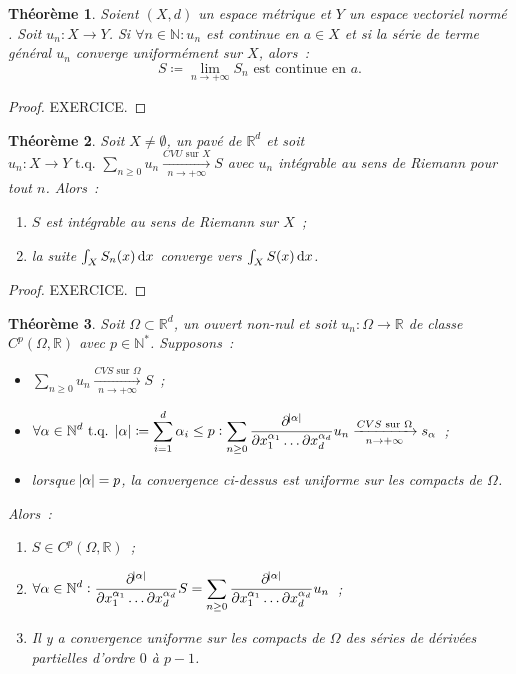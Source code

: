 \documentclass{report}
\newtheorem{thm}{Théorème}[chapter]
\theoremstyle{definition}
\theoremstyle{remark}
\numberwithin{equation}{section}
\newcommand{\R}{\mathbb R}
\newcommand{\N}{\mathbb N}
\newcommand{\tq}{\text{ t.q. }}
\newcommand{\CONV}[5]{\xrightarrow[#2 \to #3]{#4 \text{ #5 } #1}}
\newcommand{\CVS}[3]{\CONV{#1}{#2}{#3}{CVS}{sur}}
\newcommand{\CVU}[3]{\CONV{#1}{#2}{#3}{CVU}{sur}}
\newcommand{\pinfty}{{+\infty}}
\newcommand{\evn}{espace vectoriel normé }
\begin{document}
			\begin{thm}\label{thm:fncvusériecvg} Soient $(X, d)$ un espace métrique et $Y$ un \evn. Soit $u_n : X \to Y$. Si $\forall n \in \N : u_n$ est continue en
			$a \in X$ et si la série de terme général $u_n$ converge uniformément sur $X$, alors~:
			\begin{equation}
				S \coloneqq \lim_{n \to \pinfty}S_n \text{ est continue en } a.
			\end{equation}
			\end{thm}

			\begin{proof} EXERCICE.
			\end{proof}

			\begin{thm} Soit $X \neq \emptyset$, un pavé de $\R^d$ et soit $u_n : X \to Y \tq \sum_{n \geq 0}u_n \CVU Xn\pinfty S$ avec $u_n$ intégrable au
			sens de Riemann pour tout $n$. Alors~:
			\begin{enumerate}
				\item $S$ est intégrable au sens de Riemann sur $X$~;
				\item la suite $\int_XS_n(x)\dif x$ converge vers $\int_XS(x)\dif x$.
			\end{enumerate}
			\end{thm}

			\begin{proof} EXERCICE.
			\end{proof}

			\begin{thm} Soit $\Omega \subset \R^d$, un ouvert non-nul et soit $u_n : \Omega \to \R$ de classe $C^p(\Omega, \R)$ avec $p \in \N^*$.
			Supposons~:
			\begin{itemize}
				\item $\sum_{n \geq 0}u_n \CVS \Omega n\pinfty S$~;
				\item $\displaystyle \forall \alpha \in \N^d \tq \abs \alpha \coloneqq \sum_{i=1}^d\alpha_i \leq p :
					\sum_{n \geq 0}\frac {\partial^{\abs \alpha}}{\partial x_1^{\alpha_1}\ldots\partial x_d^{\alpha_d}}u_n \CVS \Omega n\pinfty s_{\alpha}$~;
				\item lorsque $\abs \alpha = p$, la convergence ci-dessus est uniforme sur les compacts de $\Omega$.
			\end{itemize}

			Alors~:
			\begin{enumerate}
				\item $S \in C^p(\Omega, \R)$~;
				\item $\displaystyle \forall \alpha \in \N^d :
					\frac {\partial^{\abs \alpha}}{\partial x_1^{\alpha_1}\ldots\partial x_d^{\alpha_d}}S =
						\sum_{n \geq 0}\frac {\partial^{\abs \alpha}}{\partial x_1^{\alpha_1}\ldots\partial x_d^{\alpha_d}}u_n$~;
				\item Il y a convergence uniforme sur les compacts de $\Omega$ des séries de dérivées partielles d'ordre $0$ à $p-1$.
			\end{enumerate}
			\end{thm}
\end{document}
